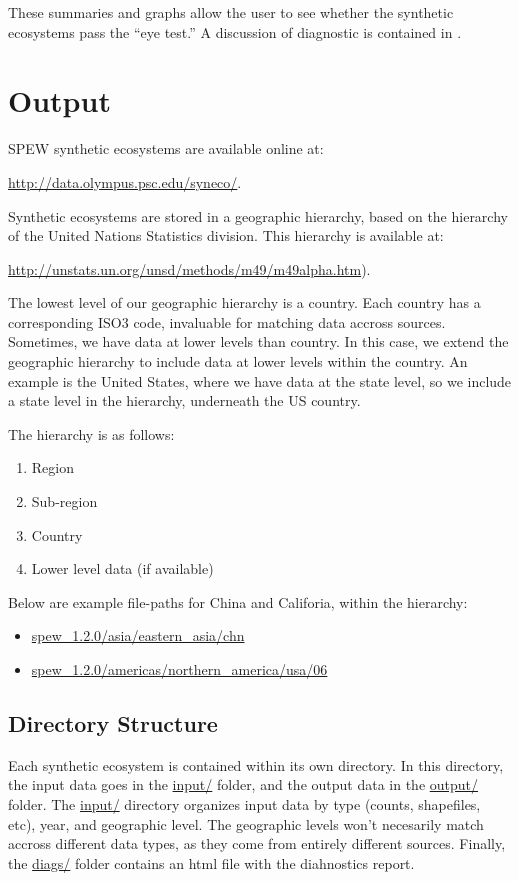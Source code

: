 \documentclass{article}
\begin{document}
\noindent These summaries and graphs allow the user to see whether the synthetic ecosystems pass the ``eye test.'' A discussion of diagnostic is contained in \cite{spew}. 

\newpage
\section{Output}
\label{sec:output}
SPEW synthetic ecosystems are available online at: 

\vspace{2mm}
	\url{http://data.olympus.psc.edu/syneco/}. 
\vspace{2mm}

Synthetic ecosystems are stored in a geographic hierarchy, based on the hierarchy of the United Nations Statistics division. This hierarchy is available at: 
	
\vspace{2mm}
	\url{http://unstats.un.org/unsd/methods/m49/m49alpha.htm}). 
\vspace{2mm}

The lowest level of our geographic hierarchy is a country. Each country has a corresponding ISO3 code, invaluable for matching data accross sources. Sometimes, we have data at lower levels than country. In this case, we extend the geographic hierarchy to include data at lower levels within the country. An example is the United States, where we have data at the state level, so we include a state level in the hierarchy, underneath the US country.

The hierarchy is as follows:

\begin{enumerate}
	\item Region
	\item Sub-region 
	\item Country
	\item Lower level data (if available)
\end{enumerate}

Below are example file-paths for China and Califoria, within the hierarchy:

\begin{itemize}
	\item \url{spew_1.2.0/asia/eastern_asia/chn}
	\item \url{spew_1.2.0/americas/northern_america/usa/06}
\end{itemize}

\subsection{Directory Structure}
Each synthetic ecosystem is contained within its own directory. In this directory, the input data goes in the \url{input/} folder, and the output data in the \url{output/} folder. The \url{input/} directory organizes input data by type (counts, shapefiles, etc), year, and geographic level. The geographic levels won't necesarily match accross different data types, as they come from entirely different sources. Finally, the \url{diags/} folder contains an html file with the diahnostics report. 
\end{document}
